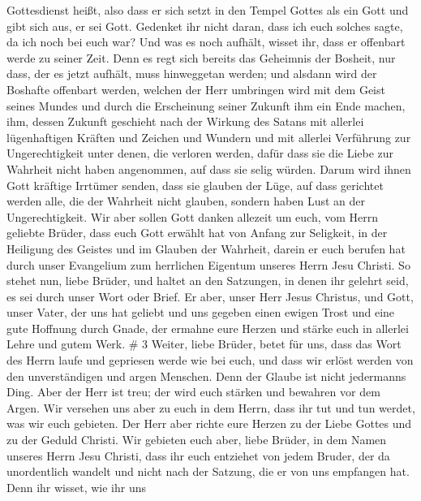 Gottesdienst heißt, also dass er sich setzt in den Tempel Gottes als ein
Gott und gibt sich aus, er sei Gott.  Gedenket ihr nicht
daran, dass ich euch solches sagte, da ich noch bei euch war?
 Und was es noch aufhält, wisset ihr, dass er offenbart
werde zu seiner Zeit.  Denn es regt sich bereits das
Geheimnis der Bosheit, nur dass, der es jetzt aufhält, muss hinweggetan
werden;  und alsdann wird der Boshafte offenbart werden,
welchen der Herr umbringen wird mit dem Geist seines Mundes und durch
die Erscheinung seiner Zukunft ihm ein Ende machen,  ihm,
dessen Zukunft geschieht nach der Wirkung des Satans mit allerlei
lügenhaftigen Kräften und Zeichen und Wundern  und mit
allerlei Verführung zur Ungerechtigkeit unter denen, die verloren
werden, dafür dass sie die Liebe zur Wahrheit nicht haben angenommen,
auf dass sie selig würden.  Darum wird ihnen Gott kräftige
Irrtümer senden, dass sie glauben der Lüge,  auf dass
gerichtet werden alle, die der Wahrheit nicht glauben, sondern haben
Lust an der Ungerechtigkeit.  Wir aber sollen Gott danken
allezeit um euch, vom Herrn geliebte Brüder, dass euch Gott erwählt hat
von Anfang zur Seligkeit, in der Heiligung des Geistes und im Glauben
der Wahrheit,  darein er euch berufen hat durch unser
Evangelium zum herrlichen Eigentum unseres Herrn Jesu Christi.
 So stehet nun, liebe Brüder, und haltet an den Satzungen,
in denen ihr gelehrt seid, es sei durch unser Wort oder Brief.
 Er aber, unser Herr Jesus Christus, und Gott, unser Vater,
der uns hat geliebt und uns gegeben einen ewigen Trost und eine gute
Hoffnung durch Gnade,  der ermahne eure Herzen und stärke
euch in allerlei Lehre und gutem Werk. \# 3  Weiter, liebe
Brüder, betet für uns, dass das Wort des Herrn laufe und gepriesen werde
wie bei euch,  und dass wir erlöst werden von den
unverständigen und argen Menschen. Denn der Glaube ist nicht jedermanns
Ding.  Aber der Herr ist treu; der wird euch stärken und
bewahren vor dem Argen.  Wir versehen uns aber zu euch in
dem Herrn, dass ihr tut und tun werdet, was wir euch gebieten.
 Der Herr aber richte eure Herzen zu der Liebe Gottes und zu
der Geduld Christi.  Wir gebieten euch aber, liebe Brüder,
in dem Namen unseres Herrn Jesu Christi, dass ihr euch entziehet von
jedem Bruder, der da unordentlich wandelt und nicht nach der Satzung,
die er von uns empfangen hat.  Denn ihr wisset, wie ihr uns
